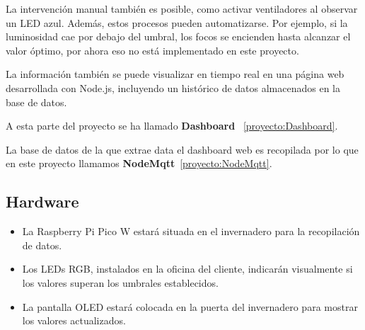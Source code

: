 La intervención manual también es posible, como activar ventiladores al observar un LED azul. Además, estos procesos pueden automatizarse. Por ejemplo, si la luminosidad cae por debajo del umbral, los focos se encienden hasta alcanzar el valor óptimo, por ahora eso no está implementado en este proyecto.

La información también se puede visualizar en tiempo real en una página web desarrollada con Node.js, incluyendo un histórico de datos almacenados en la base de datos.

A esta parte del proyecto se ha llamado \textbf{Dashboard} ~\ref{proyecto:Dashboard}.

La base de datos de la que extrae data el dashboard web es recopilada por lo que en este proyecto llamamos \textbf{NodeMqtt}~\ref{proyecto:NodeMqtt}.



\subsection{Hardware}\label{proyecto:Hardware}
\begin{itemize}
	\item La Raspberry Pi Pico W estará situada en el invernadero para la recopilación de datos.
	\item Los LEDs RGB, instalados en la oficina del cliente, indicarán visualmente si los valores superan los umbrales establecidos.
	\item La pantalla OLED estará colocada en la puerta del invernadero para mostrar los valores actualizados.
\end{itemize}

